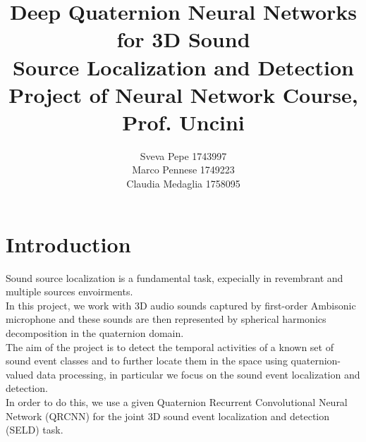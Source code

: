 \documentclass{article}
\title{Deep Quaternion Neural Networks for 3D Sound \\ Source Localization and Detection
\\ \large{\vspace{0.4cm}Project of Neural Network Course, Prof. Uncini}}
\author{Sveva Pepe 1743997 \\  Marco Pennese 1749223 \\  Claudia Medaglia 1758095}
\date{}
\begin{document}
    \maketitle
    \section{Introduction}
    Sound source localization is a fundamental task, expecially in revembrant and multiple sources envoirments.\\
    In this project, we work with 3D audio sounds captured by first-order Ambisonic microphone and these sounds are then represented 
    by spherical harmonics decomposition in the quaternion domain.
    \\ The aim of the project is to detect the temporal activities of a known set of sound event classes and to further locate them in 
    the space using quaternion-valued data processing, in particular we focus on the sound event localization and detection. 
    \\ In order to do this, we use a given Quaternion Recurrent Convolutional Neural Network (QRCNN) 
    for the joint 3D sound event localization and detection (SELD) task.
\end{document}
